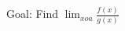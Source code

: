 \documentclass[preview]{standalone}
\begin{document}
\begin{center}
Goal: Find $\lim_{x 	o a} \frac{f(x)}{g(x)}$
\end{center}
\end{document}
